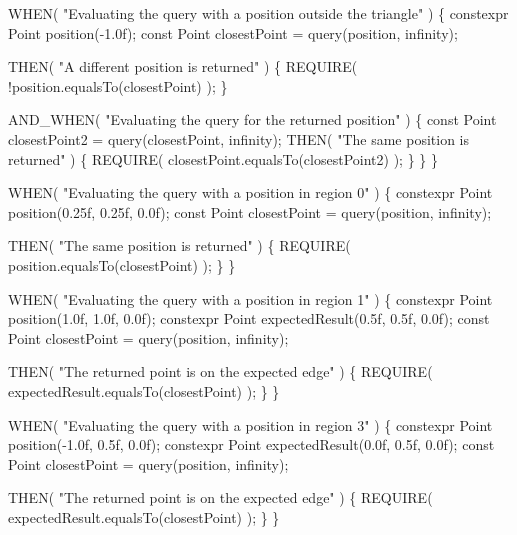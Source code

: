 \begin{DoxyCodeInclude}
        WHEN( \textcolor{stringliteral}{"Evaluating the query with a position outside the triangle"} )
        \{
            constexpr Point position(-1.0f);
            \textcolor{keyword}{const} Point closestPoint = query(position, infinity);

            THEN( \textcolor{stringliteral}{"A different position is returned"} )
            \{
                REQUIRE( !position.equalsTo(closestPoint) );
            \}

            AND\_WHEN( \textcolor{stringliteral}{"Evaluating the query for the returned position"} )
            \{
                \textcolor{keyword}{const} Point closestPoint2 = query(closestPoint, infinity);
                THEN( \textcolor{stringliteral}{"The same position is returned"} )
                \{
                    REQUIRE( closestPoint.equalsTo(closestPoint2) );
                \}
            \}
        \}

        WHEN( \textcolor{stringliteral}{"Evaluating the query with a position in region 0"} )
        \{
            constexpr Point position(0.25f, 0.25f, 0.0f);
            \textcolor{keyword}{const} Point closestPoint = query(position, infinity);

            THEN( \textcolor{stringliteral}{"The same position is returned"} )
            \{
                REQUIRE( position.equalsTo(closestPoint) );
            \}
        \}

        WHEN( \textcolor{stringliteral}{"Evaluating the query with a position in region 1"} )
        \{
            constexpr Point position(1.0f, 1.0f, 0.0f);
            constexpr Point expectedResult(0.5f, 0.5f, 0.0f);
            \textcolor{keyword}{const} Point closestPoint = query(position, infinity);

            THEN( \textcolor{stringliteral}{"The returned point is on the expected edge"} )
            \{
                REQUIRE( expectedResult.equalsTo(closestPoint) );
            \}
        \}

        WHEN( \textcolor{stringliteral}{"Evaluating the query with a position in region 3"} )
        \{
            constexpr Point position(-1.0f, 0.5f, 0.0f);
            constexpr Point expectedResult(0.0f, 0.5f, 0.0f);
            \textcolor{keyword}{const} Point closestPoint = query(position, infinity);

            THEN( \textcolor{stringliteral}{"The returned point is on the expected edge"} )
            \{
                REQUIRE( expectedResult.equalsTo(closestPoint) );
            \}
        \}


\end{DoxyCodeInclude}
